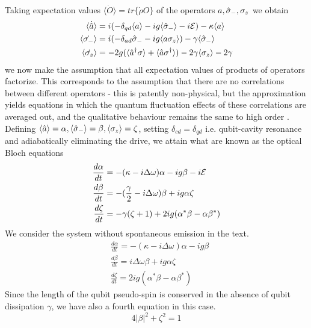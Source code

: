 Taking expectation values $\langle \dot{O} \rangle = tr\{\dot{\rho} O \}$ of the operators $a, \hat{\sigma}_-, \sigma_z$ we obtain
\begin{align}
  \langle \dot{\hat{a}} \rangle & = i(-\delta_{qd}\langle a \rangle - ig \langle \hat{\sigma}_- \rangle -i\mathcal{E}) -\kappa \langle a \rangle \\
  \langle \dot{\sigma_-} \rangle & = i(-\delta_{ad}\hat{\sigma}_- - ig \langle a \sigma_z \rangle) - \gamma \langle \hat{\sigma}_- \rangle \\
  \langle \dot{\sigma_z} \rangle & = -2g ( \langle \hat{a}^\dagger \sigma \rangle + \langle \hat{a} \sigma^\dagger \rangle) - 2 \gamma \langle \sigma_z \rangle - 2 \gamma
\end{align}
we now make the assumption that all expectation values of products of operators factorize. This corresponds to the assumption that there are no correlations between different operators - this is patently non-physical, but the approximation yields equations in which the quantum fluctuation effects of these correlations are averaged out, and the qualitative behaviour remains the same to high order \cite{Jaynes1963a}. Defining $\langle \hat{a} \rangle = \alpha, \langle \hat{\sigma}_- \rangle = \beta, \langle
\sigma_z \rangle = \zeta$, setting $\delta_{cd} = \delta_{qd}$ i.e. qubit-cavity resonance and adiabatically eliminating the drive, we attain what are known as the optical Bloch equations
\begin{align}
  \label{sc_with_gamma}
  \frac{d \alpha}{dt} &= -(\kappa - i \Delta \omega)\alpha - ig \beta - i\mathcal{E}\\
  \frac{d \beta}{dt} &= -(\frac{\gamma}{2}-i\Delta\omega)\beta+ig\alpha\zeta \\
  \frac{d\zeta}{dt} &= -\gamma (\zeta +1)+2ig(\alpha^*\beta-\alpha\beta^*) 
\end{align}
We consider the system without spontaneous emission in the text.
\begin{align}
  \label{sc_without_gamma}
  &\frac{d \alpha}{dt} = -(\kappa -i \Delta \omega) \alpha-ig \beta \\
  &\frac{d \beta}{dt} = i \Delta \omega \beta +ig \alpha \zeta \\
  &\frac{d \zeta}{dt} = 2 i g(\alpha^* \beta -\alpha \beta^*)
\end{align}
Since the length of the qubit pseudo-spin is conserved in the absence of qubit dissipation $\gamma$, we have also a fourth equation in this case.
\begin{equation}
  4|\beta|^2+\zeta^2 = 1 
\end{equation}
